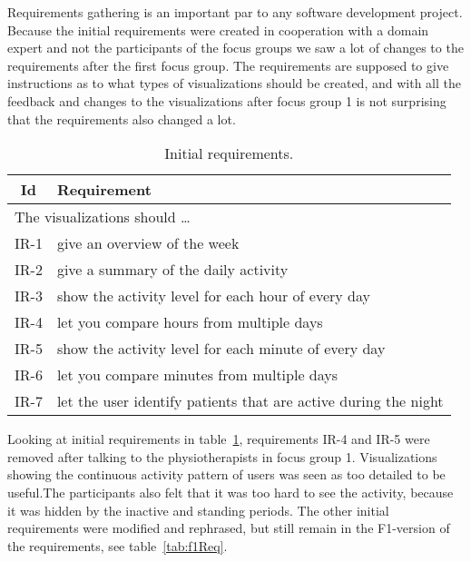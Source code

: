 Requirements gathering is an important par to any software development project. Because the initial requirements were created in cooperation with a domain expert and not the participants of the focus groups we saw a lot of changes to the requirements after the first focus group. The requirements are supposed to give instructions as to what types of visualizations should be created, and with all the feedback and changes to the visualizations after focus group 1 is not surprising that the requirements also changed a lot. 

\begin{table}[h!]
  \begin{center}
  \begin{tabular}{|c|p{12cm}|}
    \hline
      \textbf{Id} & \textbf{Requirement} \\ \hline
    \multicolumn{2}{|l|}{The visualizations should \ldots} \\ \hline
      IR-1 & give an overview of the week \\ \hline
      IR-2 & give a summary of the daily activity \\ \hline
      IR-3 & show the activity level for each hour of every day \\ \hline
      IR-4 & let you compare hours from multiple days \\ \hline
      IR-5 & show the activity level for each minute of every day \\ \hline
      IR-6 & let you compare minutes from multiple days \\ \hline
      IR-7 & let the user identify patients that are active during the night \\ \hline
  \end{tabular}
  \end{center}
  \caption{Initial requirements.}
  \label{tab:initReq}
\end{table}

Looking at initial requirements in table~\ref{tab:initReq}, requirements IR-4 and IR-5 were removed after talking to the physiotherapists in focus group 1. Visualizations showing the continuous activity pattern of users was seen as too detailed to be useful.The participants also felt that it was too hard to see the activity, because it was hidden by the inactive and standing periods. The other initial requirements were modified and rephrased, but still remain in the F1-version of the requirements, see table~\ref{tab:f1Req}. 

